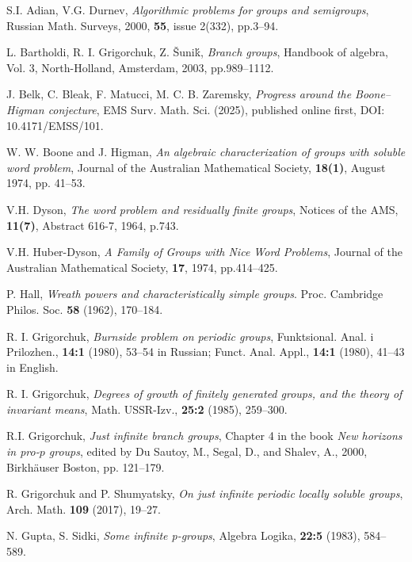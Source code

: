 \documentclass[12pt,a4paper]{amsart}
\begin{document}
\begin{thebibliography}{}

S.I. Adian, V.G. Durnev, \emph{Algorithmic problems for groups and semigroups},
Russian Math. Surveys, 2000, \textbf{55}, issue 2(332), pp.3--94.

L. Bartholdi, R. I. Grigorchuk, Z. Šuniḱ, \emph{Branch groups}, Handbook of algebra, Vol. 3, North-Holland, Amsterdam, 2003, pp.989--1112.

J. Belk, C. Bleak, F. Matucci, M. C. B. Zaremsky, \emph{Progress around the Boone–Higman conjecture}, EMS Surv. Math. Sci. (2025), published online first, DOI: 10.4171/EMSS/101.

W. W. Boone and J. Higman, \emph{An algebraic characterization of groups with soluble word problem}, Journal of the Australian Mathematical Society, \textbf{18(1)}, August 1974, pp. 41--53.

V.H. Dyson, \emph{The word problem and residually finite groups}, Notices of the AMS, \textbf{11(7)}, Abstract 616-7, 1964, p.743.

V.H. Huber-Dyson, \emph{A Family of Groups with Nice Word Problems}, Journal of the Australian Mathematical Society, \textbf{17}, 1974, pp.414--425.

P. Hall, \emph{Wreath powers and characteristically simple groups}. Proc. Cambridge Philos.
Soc. \textbf{58} (1962), 170--184.

R. I. Grigorchuk, \emph{Burnside problem on periodic groups}, Funktsional. Anal. i Prilozhen., \textbf{14:1} (1980), 53--54 in Russian; Funct. Anal. Appl., \textbf{14:1} (1980), 41--43 in English.

R. I. Grigorchuk, \emph{Degrees of growth of finitely generated groups, and the theory of invariant means}, Math. USSR-Izv., \textbf{25:2} (1985), 259--300.

R.I. Grigorchuk, \emph{Just infinite branch groups}, Chapter 4 in the book
\emph{New horizons in pro-$p$ groups}, edited by Du Sautoy, M., Segal, D., and Shalev, A., 2000, Birkhäuser Boston, pp. 121--179.

R. Grigorchuk and P. Shumyatsky, \emph{On just infinite periodic locally soluble groups}, Arch. Math. \textbf{109} (2017), 19--27.

N. Gupta, S. Sidki, \emph{Some infinite p-groups}, Algebra Logika, \textbf{22:5} (1983), 584--589.


\end{thebibliography}
\end{document}
